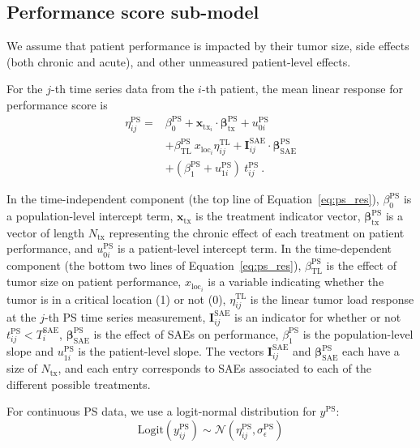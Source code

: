\documentclass[twocolumn]{bmcart}%
\def\v#1{\bm{#1}}
\newcommand{\norm}{\ensuremath{\mathcal{N}}}
\newcommand{\tl}{\ensuremath{\text{TL}}}
\newcommand{\ps}{\ensuremath{\text{PS}}}
\newcommand{\sae}{\ensuremath{\text{SAE}}}
\begin{document}
\subsection{Performance score sub-model}\label{sec:model-ps}

We assume that patient performance is impacted by their tumor size, side effects (both chronic and acute), and other unmeasured patient-level effects.

For the $j$-th time series data from the $i$-th patient, the mean linear response for performance score is
\begin{align}
  \label{eq:ps_res}
  \eta_{ij}^\ps =& \beta_0^\ps + \v x_{\text{tx}_i} \cdot \v \beta_\text{tx}^\ps + u_{0i}^\ps \nonumber \\ 
               & + \beta_\tl^\ps \ x_{\text{loc}_i} \eta_{ij}^\tl + \v I_{ij}^\sae \cdot \v \beta_\sae^\ps \\
               & + (\beta_1^\ps + u_{1i}^\ps) \ t_{ij}^\ps \ . \nonumber
\end{align}

In the time-independent component (the top line of Equation~\ref{eq:ps_res}), $\beta_0^\ps$ is a population-level intercept term, $\v x_\text{tx}$ is the treatment indicator vector, $\v \beta_\text{tx}^\ps$ is a vector of length $N_\text{tx}$ representing the chronic effect of each treatment on patient performance, and $u_{0i}^\ps$ is a patient-level intercept term.
In the time-dependent component (the bottom two lines of Equation~\ref{eq:ps_res}), $\beta_\tl^\ps$ is the effect of tumor size on patient performance, $x_{\text{loc}_i}$ is a variable indicating whether the tumor is in a critical location (1) or not (0), $\eta_{ij}^\tl$ is the linear tumor load response at the $j$-th PS time series measurement, $\v I_{ij}^\sae$ is an indicator for whether or not $t_{ij}^\ps < T_i^\sae$, $\v \beta_\sae^\ps$ is the effect of SAEs on performance, $\beta_1^\ps$ is the population-level slope and $u_{1i}^\ps$ is the patient-level slope.
The vectors $\v I_{ij}^\sae$ and $\v \beta_\sae^\ps$ each have a size of $N_\text{tx}$, and each entry corresponds to SAEs associated to each of the different possible treatments.

For continuous PS data, we use a logit-normal distribution for $y^\ps$:
\begin{equation}
  \label{eq:ps_likelihood}
  \text{Logit}\left(y^\ps_{ij}\right) \sim \norm(\eta_{ij}^\ps, \sigma_\epsilon^\ps)
\end{equation}
\end{document}

